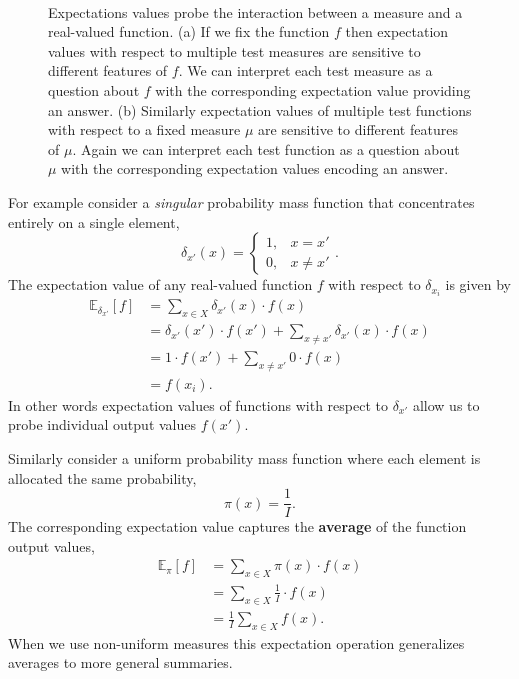 \documentclass[
  letterpaper,
  DIV=11,
  numbers=noendperiod]{scrartcl}
\begin{document}
\begin{figure}
\begin{minipage}[t]{0.45\linewidth}
{{}

}

\subcaption{\label{fig-probing-measures}}
\end{minipage}%
%
\begin{minipage}[t]{0.05\linewidth}

{\centering 

~

}

\end{minipage}%

\caption{\label{fig-probes}Expectations values probe the interaction
between a measure and a real-valued function. (a) If we fix the function
\(f\) then expectation values with respect to multiple test measures are
sensitive to different features of \(f\). We can interpret each test
measure as a question about \(f\) with the corresponding expectation
value providing an answer. (b) Similarly expectation values of multiple
test functions with respect to a fixed measure \(\mu\) are sensitive to
different features of \(\mu\). Again we can interpret each test function
as a question about \(\mu\) with the corresponding expectation values
encoding an answer.}

\end{figure}

For example consider a \emph{singular} probability mass function that
concentrates entirely on a single element, \[
\delta_{x'} (x) =
\left\{
\begin{array}{rr}
1, & x = x' \\
0, & x \neq x'
\end{array}
\right. .
\] The expectation value of any real-valued function \(f\) with respect
to \(\delta_{x_{i}}\) is given by \begin{align*}
\mathbb{E}_{\delta_{x'}}[f]
&= \sum_{x \in X} \delta_{x'}(x) \cdot f(x)
\\
&= \delta_{x'}(x') \cdot f(x')
  + \sum_{x \neq x'} \delta_{x'}(x) \cdot f(x)
\\
&=  1 \cdot f(x')
  + \sum_{x \neq x'} 0 \cdot f(x)
\\
&= f(x_{i}).
\end{align*} In other words expectation values of functions with respect
to \(\delta_{x'}\) allow us to probe individual output values \(f(x')\).

Similarly consider a uniform probability mass function where each
element is allocated the same probability, \[
\pi(x) = \frac{1}{I}.
\] The corresponding expectation value captures the \textbf{average} of
the function output values, \begin{align*}
\mathbb{E}_{\pi}[f]
&= \sum_{x \in X} \pi(x) \cdot f(x)
\\
&= \sum_{x \in X} \frac{1}{I} \cdot f(x)
\\
&= \frac{1}{I} \sum_{x \in X} f(x).
\end{align*} When we use non-uniform measures this expectation operation
generalizes averages to more general summaries.
\end{document}
